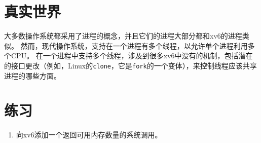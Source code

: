 \section{真实世界}
大多数操作系统都采用了进程的概念，并且它们的进程大部分都和xv6的进程类似。
然而，现代操作系统，支持在一个进程有多个线程，以允许单个进程利用多个CPU。
在一个进程中支持多个线程，涉及到很多xv6中没有的机制，包括潜在的接口更改（例如，Linux的\texttt{clone}，它是\texttt{fork}的一个变体），来控制线程应该共享进程的哪些方面。

\section{练习}
\begin{enumerate}
    \item 向xv6添加一个返回可用内存数量的系统调用。
\end{enumerate}

